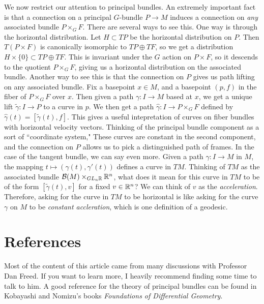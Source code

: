 \documentclass[abstract=on,twoside]{scrreprt}
\begin{document}
We now restrict our attention to principal bundles. An extremely important fact
is that a connection on a principal $G$-bundle $P \to M$ induces a connection
on \emph{any} associated bundle $P \times_G F$. There are several ways to see this.
One way is through the horizontal distribution. Let $H \subset TP$ be the horizontal
distribution on $P$. Then $T(P \times F)$ is canonically isomorphic to $TP \oplus TF$,
so we get a distribution $H \times \{0\} \subset TP \oplus TF$. This is invariant
under the $G$ action on $P \times F$, so it descends to the quotient $P \times_G F$,
giving us a horizontal distribution on the associated bundle. Another way to
see this is that the connection on $P$ gives us path lifting on any associated bundle.
Fix a basepoint $x \in M$, and a basepoint $(p, f)$ in the fiber of $P \times_G F$
over $x$. Then given a path $\gamma : I \to M$ based at $x$, we get a unique lift
$\widetilde{\gamma} : I \to P$ to a curve in $p$. We then get a path
$\widehat{\gamma} : I \to P \times_G F$ defined by
$\widehat{\gamma}(t) = [\widetilde{\gamma}(t), f]$. This gives a useful intepretation
of curves on fiber bundles with horizontal velocity vectors. Thinking of the
principal bundle component as a sort of ``coordinate system," These curves
are constant in the second component, and the connection on $P$ allows us to pick a
distinguished path of frames. In the case of the tangent bundle, we can say
even more. Given a path $\gamma : I \to M$ in $M$, the mapping
$t \mapsto (\gamma(t), \gamma'(t))$ defines a curve in $TM$. Thinking of $TM$ as the
associated bundle $\mathcal{B}(M) \times_{GL_n\mathbb{R}} \mathbb{R}^n$, what does it mean
for this curve in $TM$ to be of the form $[\widetilde{\gamma}(t), v]$ for a fixed
$v \in \mathbb{R}^n$? We can think of $v$ as the \emph{acceleration}. Therefore, asking for
the curve in $TM$ to be horizontal is like asking for the curve $\gamma$ on $M$ to
be \emph{constant accleration}, which is one definition of a geodesic.
\section*{References}
%
Most of the content of this article came from many discussions with Professor Dan
Freed. If you want to learn more, I heavily recommend finding some time to talk to
him.  A good reference for the theory of principal bundles can be found in Kobayashi
and Nomizu's books \emph{Foundations of Differential Geometry}.
%
\end{document}
